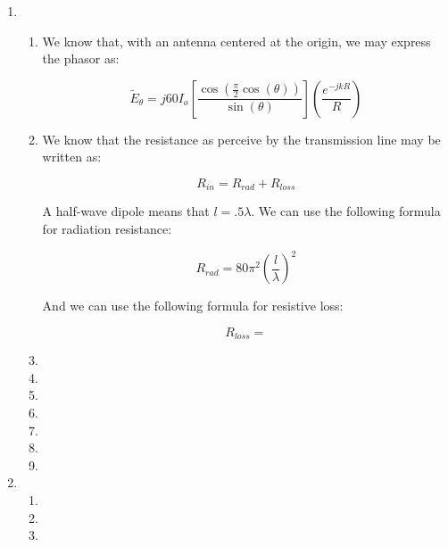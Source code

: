 \begin{enumerate}

  \item 

    \begin{enumerate}

      \item 

        We know that, with an antenna centered at the origin, we may express the phasor as:

        $$\tilde{E}_\theta=j60I_o\left[ \frac{\cos\left( \frac{\pi}{2}\cos(\theta) \right)}{\sin(\theta)} \right]\left(\frac{e^{-jkR}}{R}\right)$$

      \item 

        We know that the resistance as perceive by the transmission line may be written as:

        $$R_{in}=R_{rad}+R_{loss}$$

        A half-wave dipole means that $l=.5\lambda$. We can use the following formula for radiation resistance:

        $$R_{rad}=80\pi^2\left( \frac{l}{\lambda} \right)^2$$

        And we can use the following formula for resistive loss:

        $$R_{loss}=$$

      \item 

      \item 

      \item 

      \item 

      \item 

      \item 

      \item 

    \end{enumerate}

  \item 

    \begin{enumerate}
        
      \item 

      \item 

      \item 


\end{enumerate}
\end{enumerate}
